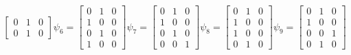 \begin{align}
\begin{bmatrix}
0 & 1 & 0 \\
0 & 1 & 0
\end{bmatrix}
\psi_{6} =
\begin{bmatrix}
0 & 1 & 0 \\
1 & 0 & 0 \\
0 & 1 & 0 \\
1 & 0 & 0
\end{bmatrix}
\psi_{7} =
\begin{bmatrix}
0 & 1 & 0 \\
1 & 0 & 0 \\
0 & 1 & 0 \\
0 & 0 & 1
\end{bmatrix}
\psi_{8} =
\begin{bmatrix}
0 & 1 & 0 \\
1 & 0 & 0 \\
1 & 0 & 0 \\
0 & 1 & 0
\end{bmatrix}
\psi_{9} =
\begin{bmatrix}
0 & 1 & 0 \\
1 & 0 & 0 \\
0 & 0 & 1 \\
0 & 1 & 0
\end{bmatrix}
\label{eq:obs_set_exp}
\end{align}


